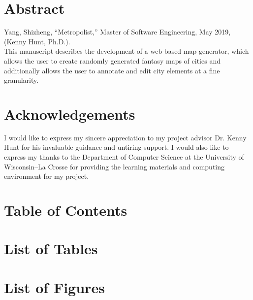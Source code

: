 \documentclass[letterpaper,12pt]{report}
\begin{document}
\hypersetup{pageanchor=false}

\clearpage


\clearpage

\hypersetup{pageanchor=true}
\setcounter{page}{1}
\renewcommand\arraystretch{1.5}

\section*{Abstract}
Yang, Shizheng, ``Metropolist,'' Master of Software Engineering, May 2019, (Kenny Hunt, Ph.D.). \\

This manuscript describes the development of a web-based map generator, which allows the user to create randomly generated fantasy maps of cities and additionally allows the user to annotate and edit city elements at a fine granularity.
\clearpage

\section*{Acknowledgements}
I would like to express my sincere appreciation to my project advisor Dr. Kenny Hunt for his invaluable guidance and untiring support. I would also like to express my thanks to the Department of Computer Science at the University of Wisconsin--La Crosse for providing the learning materials and computing environment for my project.
\clearpage

\section*{Table of Contents}
\tableofcontents
\clearpage

\section*{List of Tables}
\listoftables
\clearpage

\section*{List of Figures}
\listoffigures
\clearpage
\end{document}
